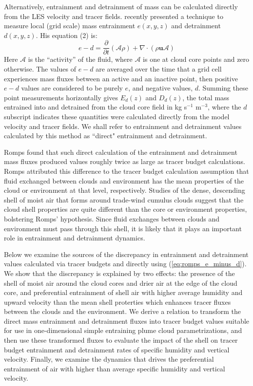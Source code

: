 \documentclass[12pt]{article}
\begin{document}
Alternatively, entrainment and detrainment of mass can be calculated directly
from the LES velocity and tracer fields.  \cite{Romps2010} recently presented a 
technique to measure local (grid scale) mass entrainment $e(x,y,z)$ and
detrainment $d(x,y,z)$.  His equation (2) is:
\begin{equation}
  \label{eq:romps_e_minus_d}
  e - d = \frac{\partial}{\partial t}(\mathcal{A}\rho) 
        + \nabla \cdot (\rho \mathbf{u} \mathcal{A}) 
\end{equation}
Here $\mathcal{A}$ is the ``activity'' of the fluid, where
$\mathcal{A}$ is one at cloud core points and zero otherwise.  The values of
$e - d$ are averaged over the time that a grid cell experiences mass
fluxes between an active and an inactive point, then positive $e-d$
values are considered to be purely $e$, and negative values, $d$.  
Summing these point measurements horizontally gives 
$E_d(z)$ and $D_d(z)$, the total mass entrained into and detrained from the
cloud core field in kg s$^{-1}$ m$^{-3}$, where the $d$ subscript indicates 
these quantities were calculated directly from the model velocity and tracer
fields.  We shall refer to entrainment and detrainment values
calculated by this method as ``direct" entrainment and detrainment.

Romps found that such direct calculation of the entrainment and
detrainment mass fluxes produced values roughly twice as large as
tracer budget calculations.  Romps attributed this difference to the 
tracer budget calculation assumption that fluid exchanged between clouds 
and environment has the mean properties of the cloud or environment at 
that level, respectively.  Studies of the dense, descending shell of 
moist air that forms around trade-wind cumulus clouds 
\citep{Jonas1990, Rodts2003, Heus2008, Jonker2008, Heus2009, Wang2010} 
suggest that the cloud shell properties are quite different than the core 
or environment properties, bolstering Romps' hypothesis.  Since fluid 
exchanges between clouds and environment must pass through this shell, it 
is likely that it plays an important role in entrainment and detrainment
dynamics.

Below we examine the sources of the discrepancy in entrainment and
detrainment values calculated via tracer budgets and directly
using (\ref{eq:romps_e_minus_d}).  We show that the discrepancy is explained by 
two effects: the presence of the shell of moist air around the cloud cores
and drier air at the edge of the cloud core, and preferential entrainment of 
shell air with higher average humidity and upward velocity than the mean shell 
proterties which enhances tracer fluxes between the clouds and the environment.
We derive a relation to transform the direct mass entrainment and detrainment 
fluxes into tracer budget values suitable for use in one-dimensional simple 
entraining plume cloud parametrizations, and then use these transformed fluxes 
to evaluate the impact of the shell on tracer budget entrainment and 
detrainment rates of specific humidity and vertical velocity.  Finally, we
examine the dynamics that drives the preferential entrainment of air with 
higher than average specific humidity and vertical velocity.
\end{document}
